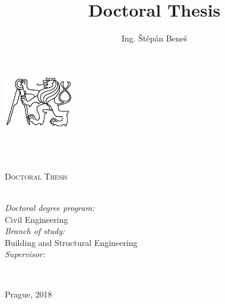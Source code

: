 \documentclass[
11pt, %
english, %
singlespacing, %
headsepline, %
]{MastersDoctoralThesis} %
\title{Doctoral Thesis}
\author{Ing. \v{S}t\v{e}p\'{a}n Bene\v{s} } %
\begin{document}
\frontmatter %

\pagestyle{plain} %


\begin{titlepage}
\begin{center}

\includegraphics[width=30mm]{figures/logo-cvut} \\
{\scshape\LARGE \univname\par} %
\HRule \\[0.2cm] %
\facname\\[0.2cm] %
\deptname %
\vspace{3.5cm}

{\huge \bfseries \ttitle\par}\vspace{1.0cm} %

\textsc{\Large Doctoral Thesis}\\[1.5cm] %
 
{\large \authorname}\\[3.0cm] %


\begin{minipage}[t]{\textwidth}
\begin{flushleft}
\emph{Doctoral degree program:} \\
Civil Engineering \\[0.5cm] %
\emph{Branch of study:} \\
Building and Structural Engineering \\[0.5cm] %

\emph{Supervisor:} \\
\supname %
\end{flushleft}
\end{minipage}\\[3cm]

\vfill

{\large Prague, 2018}\\[2cm] %
 
\vfill
\end{center}
\end{titlepage}
\end{document}
